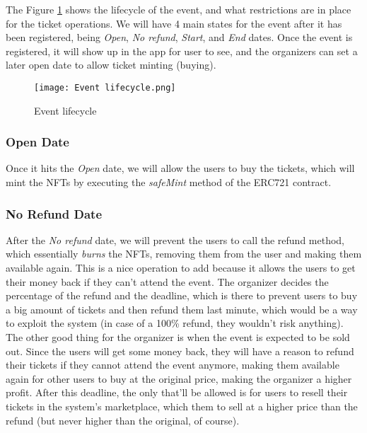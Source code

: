 The Figure \ref{fig:event_lifecycle} shows the lifecycle of the event, and what restrictions are in place for the ticket operations. We will have 4 main states for the event after it has been registered, being \textit{Open}, \textit{No refund}, \textit{Start}, and \textit{End} dates. Once the event is registered, it will show up in the app for user to see, and the organizers can set a later open date to allow ticket minting (buying).

\begin{figure}[H]
    \texttt{[image: Event lifecycle.png]}
    \centering
    \caption{Event lifecycle}
    \label{fig:event_lifecycle}
\end{figure}

\subsubsection{Open Date}

Once it hits the \textit{Open} date, we will allow the users to buy the tickets, which will mint the NFTs by executing the \textit{safeMint} method of the ERC721 contract.

\subsubsection{No Refund Date}

After the \textit{No refund} date, we will prevent the users to call the refund method, which essentially \textit{burns} the NFTs, removing them from the user and making them available again.
This is a nice operation to add because it allows the users to get their money back if they can't attend the event. The organizer decides the percentage of the refund and the deadline, which is there to prevent users to buy a big amount of tickets and then refund them last minute, which would be a way to exploit the system (in case of a 100\% refund, they wouldn't risk anything).
The other good thing for the organizer is when the event is expected to be sold out. Since the users will get some money back, they will have a reason to refund their tickets if they cannot attend the event anymore, making them available again for other users to buy at the original price, making the organizer a higher profit.
After this deadline, the only that'll be allowed is for users to resell their tickets in the system's marketplace, which them to sell at a higher price than the refund (but never higher than the original, of course).


